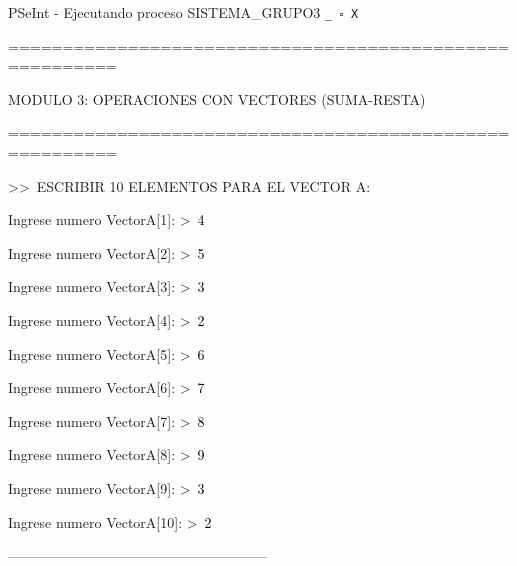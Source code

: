 \documentclass[12pt,a4paper]{article}
\newcommand{\consola}[1]{\noindent\textcolor{pseString}{#1}}
\newcommand{\entrada}[1]{\textcolor{black}{#1}}
\newenvironment{PSeIntWindow}{%
	\begin{tcolorbox}[
		breakable,
		enhanced,
		colback=white,
		colframe=black!60,
		boxrule=0.5pt,
		arc=1mm,
		left=0mm,
		right=0mm,
		top=0mm,
		bottom=2mm,
		width=\textwidth
		]
	}{%
	\end{tcolorbox}
}
\newcommand{\BarraPSeInt}{%
	\colorbox{gray!20}{%
		\parbox{\dimexpr\textwidth-2\fboxsep\relax}{%
			\small
			\textcolor{pseString}{\faPlayCircle}
			\hspace{0.3em}
			PSeInt - Ejecutando proceso SISTEMA\_GRUPO3
			\hfill
			\texttt{\_ \hspace{0.5em} \(\square\) \hspace{0.5em} X}
		}
	}
}
\begin{document}
\begin{PSeIntWindow}
	
	\BarraPSeInt
	
	\vspace{0.2cm}
	
	\ttfamily
	\small
	
	\consola{========================================================}\par
	
	\begin{center}
		\textcolor{pseString}{MODULO 3: OPERACIONES CON VECTORES (SUMA-RESTA)}
	\end{center}
	
	\consola{========================================================}\par
	
	\vspace{0.2cm}
	
	\consola{\textgreater\textgreater\ ESCRIBIR 10 ELEMENTOS PARA EL VECTOR A:}\par
	
	\vspace{0.15cm}
	
	\consola{Ingrese numero VectorA[1]: \textgreater\ }\entrada{4}\par
	\consola{Ingrese numero VectorA[2]: \textgreater\ }\entrada{5}\par
	\consola{Ingrese numero VectorA[3]: \textgreater\ }\entrada{3}\par
	\consola{Ingrese numero VectorA[4]: \textgreater\ }\entrada{2}\par
	\consola{Ingrese numero VectorA[5]: \textgreater\ }\entrada{6}\par
	\consola{Ingrese numero VectorA[6]: \textgreater\ }\entrada{7}\par
	\consola{Ingrese numero VectorA[7]: \textgreater\ }\entrada{8}\par
	\consola{Ingrese numero VectorA[8]: \textgreater\ }\entrada{9}\par
	\consola{Ingrese numero VectorA[9]: \textgreater\ }\entrada{3}\par
	\consola{Ingrese numero VectorA[10]: \textgreater\ }\entrada{2}\par
	
	\vspace{0.2cm}
	
	\consola{--------------------------------------------------------}\par
	
	\vspace{0.2cm}
	

\end{PSeIntWindow}
\end{document}
